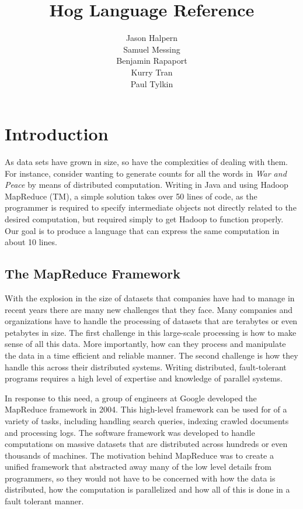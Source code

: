 \documentclass{article}
\title{\huge \textbf{Hog Language Reference}}
\author{Jason Halpern\\ Samuel Messing\\ 
        Benjamin Rapaport \\  Kurry Tran \\ Paul Tylkin}
\begin{document}
\maketitle
\newpage

\section{Introduction}
\label{sec:introduction}

As data sets have grown in size, so have the complexities of dealing with them.
For instance, consider wanting to generate counts for all the words in \emph{War
and Peace} by means of distributed computation. Writing in Java and using Hadoop
MapReduce (TM), a simple solution takes over 50 lines of code, as the programmer
is required to specify intermediate objects not directly related to the desired
computation, but required simply to get Hadoop to function properly. Our goal is
to produce a language that can express the same computation in about 10 lines.

\subsection{The MapReduce Framework}
\label{sub:mapreduce}

With the explosion in the size of datasets that companies have had to manage in
recent years there are many new challenges that they face. Many companies and
organizations have to handle the processing of datasets that are terabytes or even
petabytes in size. The first challenge in this large-scale processing is how to
make sense of all this data. More importantly, how can they process and manipulate
the data in a time efficient and reliable manner. The second challenge is how they
handle this across their distributed systems. Writing distributed, fault-tolerant
programs requires a high level of expertise and knowledge of parallel systems.

In response to this need, a group of engineers at Google developed the MapReduce
framework in 2004. This high-level framework can be used for of a variety of
tasks, including handling search queries, indexing crawled documents and
processing logs. The software framework was developed to handle computations on
massive datasets that are distributed across hundreds or even thousands of
machines. The motivation behind MapReduce was to create a unified framework that
abstracted away many of the low level details from programmers, so they would not
have to be concerned with how the data is distributed, how the computation is
parallelized and how all of this is done in a fault tolerant manner.
\end{document}
